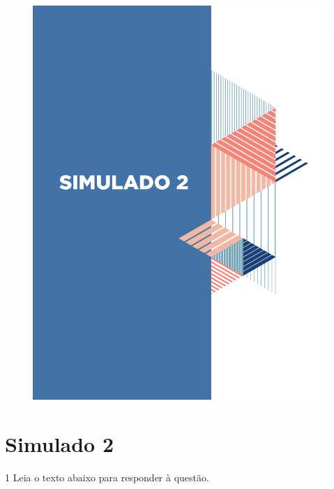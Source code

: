 \begin{figure}
\vspace*{-3cm}
\hspace*{-3.7cm}\includegraphics[scale=1]{../watermarks/2simulado9ano.pdf}
\end{figure}


\pagebreak

\section*{Simulado 2}

\num{1} Leia o texto abaixo para responder à questão.

